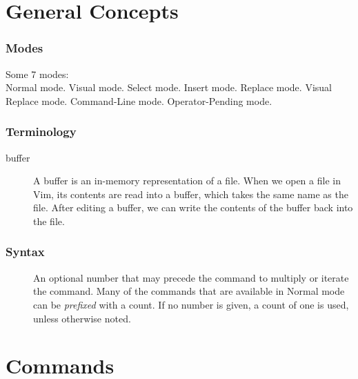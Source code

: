 \documentclass{article}
\newcommand{\syntax}[1]{\PVerb{#1}}
\begin{document}
\part{General Concepts}
\section{Modes}
Some 7 modes:\\
Normal mode. Visual mode. Select mode. Insert mode. Replace mode. Visual Replace mode. Command-Line mode. Operator-Pending mode.

\section{Terminology}
\begin{description}
  \item[buffer] A buffer is an in-memory representation of a file. When we open a file in Vim, its contents are read into a buffer, which takes the same name as the file. After editing a buffer, we can write the contents of the buffer back into the file.
\end{description}

\section{Syntax}
\begin{description}
  \item[\syntax{[count]}] An optional number that may precede the command to multiply or iterate the command. Many of the commands that are available in Normal mode can be \emph{prefixed} with a count. If no number is given, a count of one is used, unless otherwise noted.
\end{description}

\part{Commands}
\end{document}
